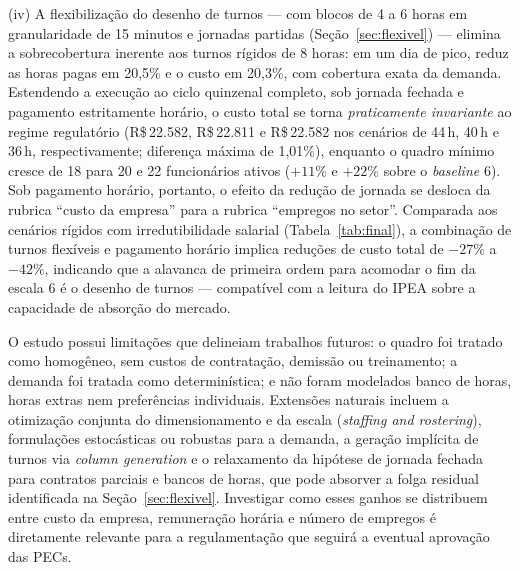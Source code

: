 \documentclass[12pt,a4paper]{article}
\begin{document}
(iv) A flexibilização do desenho de turnos --- com blocos de 4 a 6 horas em
granularidade de 15 minutos e jornadas partidas (Seção~\ref{sec:flexivel})
--- elimina a sobrecobertura inerente aos turnos rígidos de 8 horas: em um dia
de pico, reduz as horas pagas em 20,5\% e o custo em 20,3\%, com cobertura
exata da demanda. Estendendo a execução ao ciclo quinzenal completo, sob
jornada fechada e pagamento estritamente horário, o custo total se torna
\emph{praticamente invariante} ao regime regulatório (R\$\,22.582,
R\$\,22.811 e R\$\,22.582 nos cenários de 44\,h, 40\,h e 36\,h,
respectivamente; diferença máxima de 1,01\%), enquanto o quadro mínimo cresce
de 18 para 20 e 22 funcionários ativos ($+11\%$ e $+22\%$ sobre o
\emph{baseline} 6). Sob pagamento horário, portanto, o efeito da
redução de jornada se desloca da rubrica ``custo da empresa'' para a rubrica
``empregos no setor''. Comparada aos cenários rígidos com irredutibilidade
salarial (Tabela~\ref{tab:final}), a combinação de turnos flexíveis e
pagamento horário implica reduções de custo total de $-27\%$ a $-42\%$,
indicando que a alavanca de primeira ordem para acomodar o fim da escala
6 é o desenho de turnos --- compatível com a leitura do IPEA
\cite{ipea} sobre a capacidade de absorção do mercado.

O estudo possui limitações que delineiam trabalhos futuros: o quadro foi
tratado como homogêneo, sem custos de contratação, demissão ou treinamento; a
demanda foi tratada como determinística; e não foram modelados banco de horas,
horas extras nem preferências individuais. Extensões naturais incluem a
otimização conjunta do dimensionamento e da escala (\emph{staffing and
rostering}), formulações estocásticas ou robustas para a demanda, a geração
implícita de turnos via \emph{column generation} e o relaxamento da hipótese
de jornada fechada para contratos parciais e bancos de horas, que pode
absorver a folga residual identificada na Seção~\ref{sec:flexivel}.
Investigar como esses ganhos se distribuem entre custo da empresa,
remuneração horária e número de empregos é diretamente relevante para a
regulamentação que seguirá a eventual aprovação das PECs.
\end{document}
